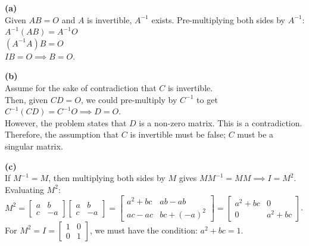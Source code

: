 \begin{solution}
\textbf{(a)} \\
Given $AB = O$ and $A$ is invertible, $A^{-1}$ exists. Pre-multiplying both sides by $A^{-1}$: \\
$A^{-1}(AB) = A^{-1}O$ \\
$(A^{-1}A)B = O$ \\
$IB = O \implies B = O$.

\medskip
\textbf{(b)} \\
Assume for the sake of contradiction that $C$ is invertible. \\
Then, given $CD = O$, we could pre-multiply by $C^{-1}$ to get $C^{-1}(CD) = C^{-1}O \implies D = O$. \\
However, the problem states that $D$ is a non-zero matrix. This is a contradiction. Therefore, the assumption that $C$ is invertible must be false; $C$ must be a singular matrix.

\medskip
\textbf{(c)} \\
If $M^{-1} = M$, then multiplying both sides by $M$ gives $MM^{-1} = MM \implies I = M^2$. \\
Evaluating $M^2$: \\
$M^2 = \begin{bmatrix} a & b \\ c & -a \end{bmatrix} \begin{bmatrix} a & b \\ c & -a \end{bmatrix} = \begin{bmatrix} a^2+bc & ab-ab \\ ac-ac & bc+(-a)^2 \end{bmatrix} = \begin{bmatrix} a^2+bc & 0 \\ 0 & a^2+bc \end{bmatrix}$. \\
For $M^2 = I = \begin{bmatrix} 1 & 0 \\ 0 & 1 \end{bmatrix}$, we must have the condition: $a^2 + bc = 1$.


\end{solution}
